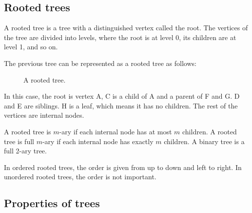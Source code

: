 \documentclass[11pt]{article}
\begin{document}
\subsection{Rooted trees}
A rooted tree is a tree with a distinguished vertex called the root. The vertices of the tree are divided into levels, where the root is at level 0, its children are at level 1, and so on.

The previous tree can be represented as a rooted tree as follows:
\begin{figure}[H]
    \centering
    \caption{A rooted tree.}
    \label{fig:rooted_tree_example}
\end{figure}

In this case, the root is vertex A, C is a child of A and a parent of F and G. D and E are siblings. H is a leaf, which means it has no children. The rest of the vertices are internal nodes.

A rooted tree is $m$-ary if each internal node has at most $m$ children. A rooted tree is full $m$-ary if each internal node has exactly $m$ children. A binary tree is a full 2-ary tree.

In ordered rooted trees, the order is given from up to down and left to right. In unordered rooted trees, the order is not important.

\subsection{Properties of trees}
\end{document}
